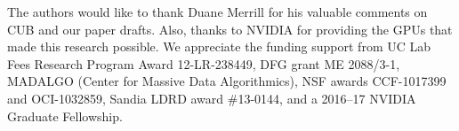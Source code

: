 The authors would like to thank Duane Merrill for his valuable comments on CUB and our paper drafts.
Also, thanks to NVIDIA for providing the GPUs that made this research possible.
We appreciate the funding support from UC Lab Fees Research Program Award 12-LR-238449, DFG grant ME 2088/3-1, MADALGO (Center for Massive Data Algorithmics), NSF awards CCF-1017399 and OCI-1032859, Sandia LDRD award \#13-0144, and a 2016--17 NVIDIA Graduate Fellowship.
